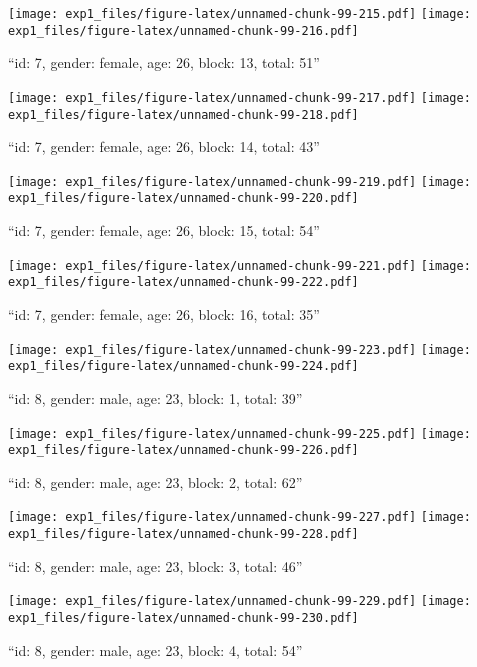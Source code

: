 \documentclass[,]{article}
\begin{document}
\texttt{[image: exp1\_files/figure-latex/unnamed-chunk-99-215.pdf]}
\texttt{[image: exp1\_files/figure-latex/unnamed-chunk-99-216.pdf]}

\newpage
[1] 

``id: 7, gender: female, age: 26, block: 13, total: 51''

\texttt{[image: exp1\_files/figure-latex/unnamed-chunk-99-217.pdf]}
\texttt{[image: exp1\_files/figure-latex/unnamed-chunk-99-218.pdf]}

\newpage
[1] 

``id: 7, gender: female, age: 26, block: 14, total: 43''

\texttt{[image: exp1\_files/figure-latex/unnamed-chunk-99-219.pdf]}
\texttt{[image: exp1\_files/figure-latex/unnamed-chunk-99-220.pdf]}

\newpage
[1] 

``id: 7, gender: female, age: 26, block: 15, total: 54''

\texttt{[image: exp1\_files/figure-latex/unnamed-chunk-99-221.pdf]}
\texttt{[image: exp1\_files/figure-latex/unnamed-chunk-99-222.pdf]}

\newpage
[1] 

``id: 7, gender: female, age: 26, block: 16, total: 35''

\texttt{[image: exp1\_files/figure-latex/unnamed-chunk-99-223.pdf]}
\texttt{[image: exp1\_files/figure-latex/unnamed-chunk-99-224.pdf]}

\newpage
[1] 

``id: 8, gender: male, age: 23, block: 1, total: 39''

\texttt{[image: exp1\_files/figure-latex/unnamed-chunk-99-225.pdf]}
\texttt{[image: exp1\_files/figure-latex/unnamed-chunk-99-226.pdf]}

\newpage
[1] 

``id: 8, gender: male, age: 23, block: 2, total: 62''

\texttt{[image: exp1\_files/figure-latex/unnamed-chunk-99-227.pdf]}
\texttt{[image: exp1\_files/figure-latex/unnamed-chunk-99-228.pdf]}

\newpage
[1] 

``id: 8, gender: male, age: 23, block: 3, total: 46''

\texttt{[image: exp1\_files/figure-latex/unnamed-chunk-99-229.pdf]}
\texttt{[image: exp1\_files/figure-latex/unnamed-chunk-99-230.pdf]}

\newpage
[1] 

``id: 8, gender: male, age: 23, block: 4, total: 54''
\end{document}
